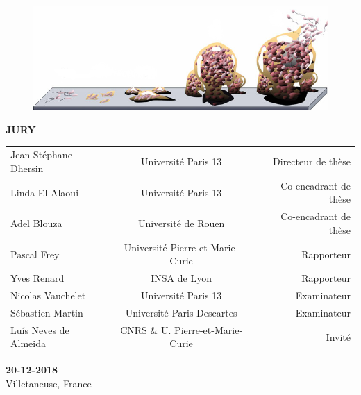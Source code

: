\documentclass[12pt,a4paper]{article}
\begin{document}
\begin{titlepage}


\begin{center}
  \begin{figure}[h]
  \begin{center}
  \includegraphics[width=0.8\linewidth]{biofilm}
  \end{center}
  \end{figure}
\end{center}
%

\begin{center}
\normalsize\sffamily
\textbf{JURY}
\end{center}

\vspace{-0.2cm}

\begin{table}[hb!]
\sffamily
\centering
\begin{tabular}{lcr}
Jean-Stéphane Dhersin & Université Paris 13 & Directeur de thèse \\
Linda El Alaoui & Université Paris 13 & Co-encadrant de thèse \\
Adel Blouza & Université de Rouen & Co-encadrant de thèse \\
Pascal Frey & Université Pierre-et-Marie-Curie & Rapporteur \\
Yves Renard & INSA de Lyon & Rapporteur \\
Nicolas Vauchelet & Université Paris 13 & Examinateur \\
Sébastien Martin & Université Paris Descartes & Examinateur\\
Luís Neves de Almeida & CNRS \& U. Pierre-et-Marie-Curie & Invité
\end{tabular}
\end{table}


\begin{center}
\sffamily
\textbf{20-12-2018} \\
Villetaneuse, France
\end{center}


\end{titlepage}
\end{document}
